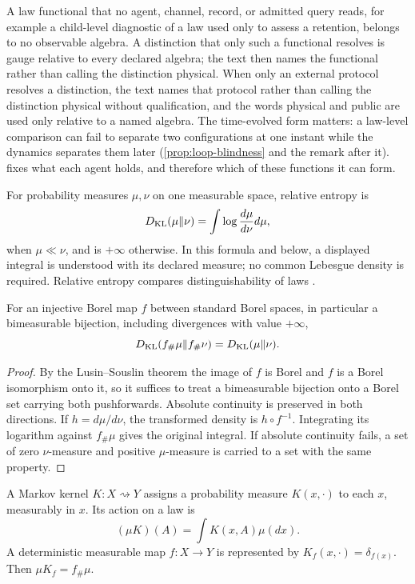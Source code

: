 A law functional that no agent, channel, record, or admitted query reads, for example a child-level diagnostic of a law used only to assess a retention, belongs to no observable algebra. A distinction that only such a functional resolves is gauge relative to every declared algebra; the text then names the functional rather than calling the distinction physical. When only an external protocol resolves a distinction, the text names that protocol rather than calling the distinction physical without qualification, and the words physical and public are used only relative to a named algebra. The time-evolved form matters: a law-level comparison can fail to separate two configurations at one instant while the dynamics separates them later (\cref{prop:loop-blindness} and the remark after it).  fixes what each agent holds, and therefore which of these functions it can form.

For probability measures $\mu,\nu$ on one measurable space, relative entropy is
\begin{equation}
D_{\mathrm{KL}}(\mu\Vert\nu)=\int\log\frac{d\mu}{d\nu}d\mu,
\label{eq:relative-entropy}
\end{equation}
when $\mu\ll\nu$, and is $+\infty$ otherwise. In this formula and below, a displayed integral is understood with its declared measure; no common Lebesgue density is required. Relative entropy compares distinguishability of laws \citep{KullbackLeibler1951}.

For an injective Borel map $f$ between standard Borel spaces, in particular a bimeasurable bijection, including divergences with value $+\infty$,
\begin{equation}
D_{\mathrm{KL}}(f_\#\mu\Vert f_\#\nu)=D_{\mathrm{KL}}(\mu\Vert\nu).
\end{equation}
\begin{proof}
By the Lusin--Souslin theorem \citep[Theorem 15.1]{Kechris1995} the image of $f$ is Borel and $f$ is a Borel isomorphism onto it, so it suffices to treat a bimeasurable bijection onto a Borel set carrying both pushforwards. Absolute continuity is preserved in both directions. If $h=d\mu/d\nu$, the transformed density is $h\circ f^{-1}$. Integrating its logarithm against $f_\#\mu$ gives the original integral. If absolute continuity fails, a set of zero $\nu$-measure and positive $\mu$-measure is carried to a set with the same property.
\end{proof}

A Markov kernel $K:X\rightsquigarrow Y$ assigns a probability measure $K(x,\cdot)$ to each $x$, measurably in $x$. Its action on a law is
\begin{equation}
(\mu K)(A)=\int K(x,A)\mu(dx).
\label{eq:kernel-action}
\end{equation}
A deterministic measurable map $f:X\to Y$ is represented by $K_f(x,\cdot)=\delta_{f(x)}$. Then $\mu K_f=f_\#\mu$.


